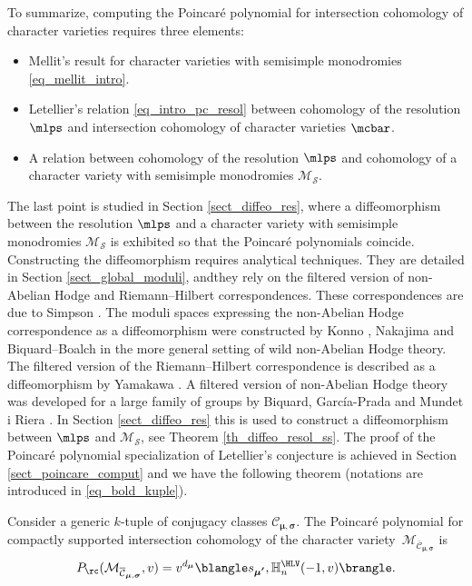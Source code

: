 To summarize, computing the Poincaré polynomial for intersection cohomology of character varieties requires three elements:
\begin{itemize}
\item Mellit's result for character varieties with semisimple monodromies \eqref{eq_mellit_intro}.
\item Letellier's relation \eqref{eq_intro_pc_resol} between cohomology of the resolution $\mlps$ and intersection cohomology of character varieties $\mcbar$.
\item A relation between cohomology of the resolution $\mlps$ and cohomology of a character variety with semisimple monodromies $\mathcal{M}_{\boldsymbol{\mathcal{S}}}$.
\end{itemize}
The last point is studied in Section \ref{sect_diffeo_res}, where a diffeomorphism between the resolution $\mlps$ and a character variety with semisimple monodromies $\mathcal{M}_{\boldsymbol{\mathcal{S}}}$ is exhibited so that the Poincaré polynomials coincide. Constructing the diffeomorphism requires analytical techniques. They are detailed in Section \ref{sect_global_moduli}, andthey rely on the filtered version of non-Abelian Hodge and Riemann--Hilbert correspondences.
These correspondences are due to Simpson \cite{Simpson}. The moduli spaces expressing the non-Abelian Hodge correspondence as a diffeomorphism were constructed by Konno \cite{Konno}, Nakajima \cite{Nakajima_1996} and Biquard--Boalch \cite{Biquard_Boalch_2004} in the more general setting of wild non-Abelian Hodge theory. The filtered version of the Riemann--Hilbert correspondence is described as a diffeomorphism by Yamakawa \cite{Yamakawa}. A filtered version of non-Abelian Hodge theory was developed for a large family of groups by Biquard, García-Prada and Mundet i Riera \cite{Biquard_Garcia_Prada_Riera}. In Section \ref{sect_diffeo_res} this is used to construct a diffeomorphism between $\mlps$ and $\mathcal{M}_{\boldsymbol{\mathcal{S}}}$, see Theorem \ref{th_diffeo_resol_ss}. The proof of the Poincaré polynomial specialization of Letellier's conjecture is achieved in Section \ref{sect_poincare_comput} and we have the following theorem (notations are introduced in \eqref{eq_bold_kuple}).

\begin{theorem}\label{th_poincaré_intro}
Consider a generic $k$-tuple of conjugacy classes ${\mathcal{C}}_{\boldsymbol{\mu},\boldsymbol{\sigma}}$. The Poincaré polynomial for compactly supported intersection cohomology of the character variety~$\mathcal{M}_{\overline{{\mathcal{C}}}_{\boldsymbol{\mu},\boldsymbol{\sigma}}}$ is
\[
P_{\rc}(\mathcal{M}_{\overline{{\mathcal{C}}}_{\boldsymbol{\mu},\boldsymbol{\sigma}}},v) = v^{d_{\boldsymbol{\mu}}}\blangle s_{\boldsymbol{\mu'}}, \mathbb{H}_n^{\HLV}(-1,v)\brangle.
\]
\end{theorem}

